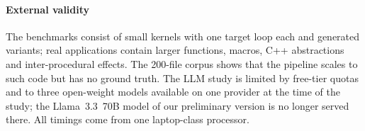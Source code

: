 \paragraph{External validity} The benchmarks consist of small kernels with one target loop each and generated variants; real applications contain larger functions, macros, C++ abstractions and inter-procedural effects. The 200-file corpus shows that the pipeline scales to such code but has no ground truth. The LLM study is limited by free-tier quotas and to three open-weight models available on one provider at the time of the study; the Llama~3.3~70B model of our preliminary version is no longer served there. All timings come from one laptop-class processor.
